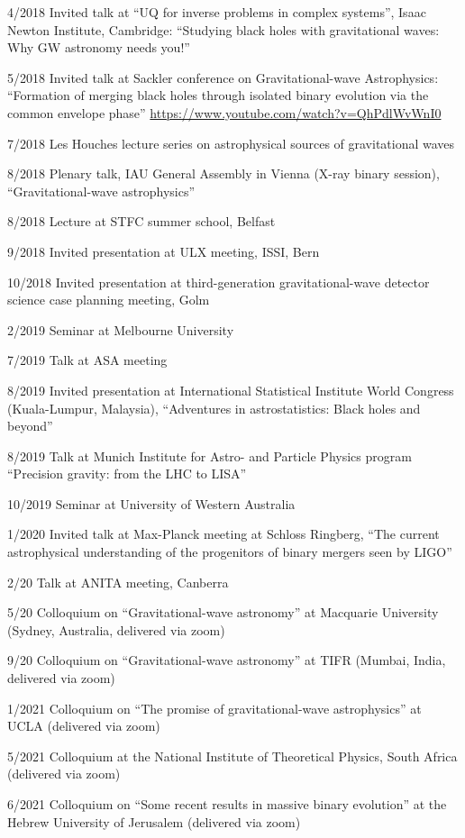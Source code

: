\documentclass[margin,line]{res}
\begin{document}
\begin{resume}
4/2018	Invited talk at ``UQ for inverse problems in complex systems'', Isaac Newton Institute, Cambridge: ``Studying black holes with gravitational waves: Why GW astronomy needs you!''

5/2018 Invited talk at Sackler conference on Gravitational-wave Astrophysics: ``Formation of merging black holes through isolated binary evolution via the common envelope phase'' \url{https://www.youtube.com/watch?v=QhPdlWvWnI0}

7/2018 Les Houches lecture series on astrophysical sources of gravitational waves

8/2018 Plenary talk, IAU General Assembly in Vienna (X-ray binary session), ``Gravitational-wave astrophysics''

8/2018 Lecture at STFC summer school, Belfast

9/2018 Invited presentation at ULX meeting, ISSI, Bern

10/2018 Invited presentation at third-generation gravitational-wave detector science case planning meeting, Golm

2/2019 Seminar at Melbourne University

7/2019 Talk at ASA meeting

8/2019 Invited presentation at International Statistical Institute World Congress (Kuala-Lumpur, Malaysia), ``Adventures in astrostatistics: Black holes and beyond''

8/2019 Talk at Munich Institute for Astro- and Particle Physics program ``Precision gravity: from the LHC to LISA''

10/2019 Seminar at University of Western Australia

1/2020 Invited talk at Max-Planck meeting at Schloss Ringberg, ``The current astrophysical understanding of the progenitors of binary mergers seen by LIGO''

2/20 Talk at ANITA meeting, Canberra

5/20 Colloquium on ``Gravitational-wave astronomy'' at Macquarie University (Sydney, Australia, delivered via zoom)

9/20 Colloquium on  ``Gravitational-wave astronomy'' at TIFR (Mumbai, India, delivered via zoom)

1/2021 Colloquium on ``The promise of gravitational-wave astrophysics'' at UCLA (delivered via zoom)

5/2021 Colloquium at the National Institute of Theoretical Physics, South Africa (delivered via zoom)

6/2021 Colloquium on ``Some recent results in massive binary evolution''  at the Hebrew University of Jerusalem (delivered via zoom)


\end{resume}
\end{document}
